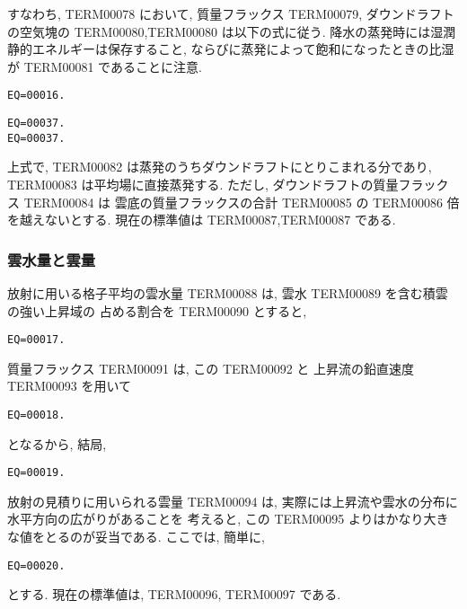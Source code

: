 すなわち, TERM00078 において, 質量フラックス TERM00079, 
ダウンドラフトの空気塊の TERM00080,TERM00080 は以下の式に従う.
降水の蒸発時には湿潤静的エネルギーは保存すること,
ならびに蒸発によって飽和になったときの比湿が
TERM00081 であることに注意. 
\begin{verbatim}
EQ=00016.
\end{verbatim}
\begin{verbatim}
EQ=00037.
EQ=00037.
\end{verbatim}

上式で, TERM00082 は蒸発のうちダウンドラフトにとりこまれる分であり,
TERM00083 は平均場に直接蒸発する. 
ただし, ダウンドラフトの質量フラックス TERM00084 は
雲底の質量フラックスの合計 TERM00085 の TERM00086 倍を越えないとする.
現在の標準値は TERM00087,TERM00087 である.

\subsubsection{雲水量と雲量}

放射に用いる格子平均の雲水量 TERM00088 は, 
雲水 TERM00089 を含む積雲の強い上昇域の
占める割合を TERM00090 とすると,
\begin{verbatim}
EQ=00017.
\end{verbatim}
質量フラックス TERM00091 は, この TERM00092 と
上昇流の鉛直速度 TERM00093 を用いて
\begin{verbatim}
EQ=00018.
\end{verbatim}
となるから, 結局,
\begin{verbatim}
EQ=00019.
\end{verbatim}

放射の見積りに用いられる雲量 TERM00094  は, 
実際には上昇流や雲水の分布に水平方向の広がりがあることを
考えると, この TERM00095  よりはかなり大きな値をとるのが妥当である.
ここでは, 簡単に, 
\begin{verbatim}
EQ=00020.
\end{verbatim}
とする.
現在の標準値は, TERM00096, TERM00097 である.
